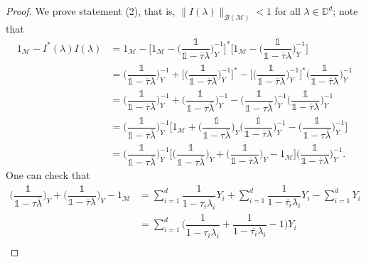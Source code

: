 \documentclass[11pt, reqno]{amsart}
\newcommand\1{\boldsymbol {1}}
\numberwithin{equation}{section}
\begin{document}
\begin{proof}
We prove statement (2), that is, $\|I(\lambda)\|_{\mathcal{B(M)}}<1$ for all $\lambda\in\mathbb{D}^{d}$; note that
\begin{align}
    1_{\mathcal{M}}-I^{*}(\lambda)I(\lambda)&=1_{\mathcal{M}}-\Bigg[1_{\mathcal{M}}-\bigg(\dfrac{\mathds{1}}{\mathds{1}-\overline{\tau}\lambda}\bigg)_{Y}^{-1}\Bigg]^{*}\Bigg[1_{\mathcal{M}}-\bigg(\dfrac{\mathds{1}}{\mathds{1}-\overline{\tau}\lambda}\bigg)_{Y}^{-1}\Bigg]\nonumber \\
    &=\bigg(\dfrac{\mathds{1}}{\mathds{1}-\overline{\tau}\lambda}\bigg)_{Y}^{-1}+\Bigg[\bigg(\dfrac{\mathds{1}}{\mathds{1}-\overline{\tau}\lambda}\bigg)_{Y}^{-1}\Bigg]^{*}-\Bigg[\bigg(\dfrac{\mathds{1}}{\mathds{1}-\overline{\tau}\lambda}\bigg)_{Y}^{-1}\Bigg]^{*}\bigg(\dfrac{\mathds{1}}{\mathds{1}-\overline{\tau}\lambda}\bigg)_{Y}^{-1}\nonumber\\
    &=\bigg(\dfrac{\mathds{1}}{\mathds{1}-\overline{\tau}\lambda}\bigg)_{Y}^{-1}+\bigg(\dfrac{\mathds{1}}{\mathds{1}-\tau\overline{\lambda}}\bigg)_{Y}^{-1}-\bigg(\dfrac{\mathds{1}}{\mathds{1}-\tau\overline{\lambda}}\bigg)_{Y}^{-1}\bigg(\dfrac{\mathds{1}}{\mathds{1}-\overline{\tau}\lambda}\bigg)_{Y}^{-1}\nonumber\\
    &=\bigg(\dfrac{\mathds{1}}{\mathds{1}-\tau\overline{\lambda}}\bigg)_{Y}^{-1}\Bigg[1_{\mathcal{M}}+\bigg(\dfrac{\mathds{1}}{\mathds{1}-\tau\overline{\lambda}}\bigg)_{Y}\bigg(\dfrac{\mathds{1}}{\mathds{1}-\overline{\tau}\lambda}\bigg)_{Y}^{-1}-\bigg(\dfrac{\mathds{1}}{\mathds{1}-\tau\overline{\lambda}}\bigg)_{Y}^{-1}\Bigg]\nonumber\\
    &= \bigg(\dfrac{\mathds{1}}{\mathds{1}-\tau\overline{\lambda}}\bigg)_{Y}^{-1}\Bigg[\bigg(\dfrac{\mathds{1}}{\mathds{1}-\tau\overline{\lambda}}\bigg)_{Y}+\bigg(\dfrac{\mathds{1}}{\mathds{1}-\overline{\tau}\lambda}\bigg)_{Y}-1_{\mathcal{M}}\Bigg]\bigg(\dfrac{\mathds{1}}{\mathds{1}-\overline{\tau}\lambda}\bigg)_{Y}^{-1}.\label{CstarAC}
\end{align}
One can check that
\begin{align}\bigg(\dfrac{\mathds{1}}{\mathds{1}-\tau\overline{\lambda}}\bigg)_{Y}+\bigg(\dfrac{\mathds{1}}{\mathds{1}-\overline{\tau}\lambda}\bigg)_{Y}-1_{\mathcal{M}} &= \sum_{i=1}^{d}\dfrac{1}{1-\tau_{i}\overline{\lambda_{i}}}Y_{i}+\sum_{i=1}^{d}\dfrac{1}{1-\overline{\tau_{i}}\lambda_{i}}Y_{i}-\sum_{i=1}^{d}Y_{i}\nonumber\\
&=\sum_{i=1}^{d}\bigg(\dfrac{1}{1-\tau_{i}\overline{\lambda_{i}}}+\dfrac{1}{1-\overline{\tau_{i}}\lambda_{i}} -1\bigg)Y_{i} \nonumber\\

\end{align}
\end{proof}
\end{document}
